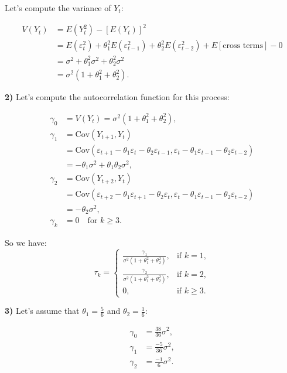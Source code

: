 \documentclass[
  a4paper]{article}
\begin{document}
Let's compute the variance of \(Y_t\):

\begin{align*}
V(Y_t) & = E(Y_t^2) - [E(Y_t)]^2 \\
       & = E(\varepsilon_t^2) + \theta_1^2 E(\varepsilon_{t-1}^2) + \theta_2^2 E(\varepsilon_{t-2}^2) + E[\text{cross terms}] - 0 \\
       & = \sigma^2 + \theta_1^2 \sigma^2 + \theta_2^2 \sigma^2 \\
       & = \sigma^2(1 + \theta_1^2 + \theta_2^2).
\end{align*}

\textbf{2)} Let's compute the autocorrelation function for this process:

\begin{align*}
\gamma_0 & = V(Y_t) = \sigma^2(1 + \theta_1^2 + \theta_2^2),
\\
\gamma_1 & = \text{Cov}(Y_{t+1}, Y_t) \\
         & = \text{Cov}(\varepsilon_{t+1} - \theta_1 \varepsilon_t - \theta_2 \varepsilon_{t-1}, \varepsilon_t - \theta_1 \varepsilon_{t-1} - \theta_2 \varepsilon_{t-2}) \\
         & = -\theta_1 \sigma^2 + \theta_1 \theta_2 \sigma^2,
\\
\gamma_2 & = \text{Cov}(Y_{t+2}, Y_t) \\
         & = \text{Cov}(\varepsilon_{t+2} - \theta_1 \varepsilon_{t+1} - \theta_2 \varepsilon_t, \varepsilon_t - \theta_1 \varepsilon_{t-1} - \theta_2 \varepsilon_{t-2}) \\
         & = -\theta_2 \sigma^2,
\\         
\gamma_k & = 0 \quad \text{for } k \geq 3.
\end{align*}

So we have: \[
\tau_k = \begin{cases}
\frac{\gamma_1}{\sigma^2(1 + \theta_1^2 + \theta_2^2)}, & \text{if } k = 1, \\
\frac{\gamma_2}{\sigma^2(1 + \theta_1^2 + \theta_2^2)}, & \text{if } k = 2, \\
0, & \text{if } k \geq 3.
\end{cases}
\]

\textbf{3)} Let's assume that \(\theta_1 = \frac{5}{6}\) and
\(\theta_2 = \frac{1}{6}\):

\begin{align*}
\gamma_0 & = \frac{38}{36} \sigma^2, \\
\gamma_1 & = \frac{-5}{36} \sigma^2, \\
\gamma_2 & = \frac{-1}{6} \sigma^2.
\end{align*}
\end{document}
